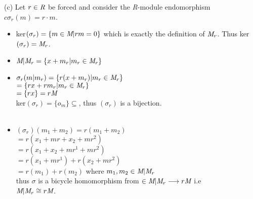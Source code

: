 \documentclass{article}
\begin{document}
(c) Let $r\in\emph{R}$ be forced and consider the \emph{R}-module endomorphism\\
$c\sigma_r(m) = r\cdot{m}$.\\
\begin{itemize}  
\item ker$(\sigma_r) = \{m\in\emph{M} \vert  rm = 0\}$ which is exactly the definition
  of $\emph{M}_r$. Thus ker$(\sigma_r) = \emph{M}_r$.\\
\item $\emph{M}\vert\emph{M}_r =\{x + m_r \vert m_r\in\emph{M}_r\}$\\
\item $\sigma_r(m\vert{m_r}) = \{r(x+m_r)\vert {m_r}\in\emph{M}_r\}$\\
  $ = \{rx + rm_r \vert {m_r}\in\emph{M}_r\}$\\
  $ = \{rx\} = r\emph{M}$
  \\
  ker$(\sigma_r) = \{o_m\}\subseteq$, thus $(\sigma_r)$ is a bijection.\\\\
  \item $(\sigma_r)(m_1 + m_2) = r(m_1 + m_2)$\\
$= r(x_1 +mr+x_2+mr^2)$\\
$= r(x_1 +x_2+mr^1+mr^2)$\\
$= r(x_1 +mr^1)+r(x_2+mr^2)$\\
$= r(m_1)+r(m_2)$ where $m_1,m_2\in\emph{M}\vert\emph{M}_r$\\
thus $\sigma$ is a bicycle homomorphism from 
$\in\emph{M}\vert\emph{M}_r \longrightarrow r\emph{M}$ i.e\\
$\emph{M}\vert\emph{M}_r\cong r\emph{M}$.
\end{itemize}
\end{document}
